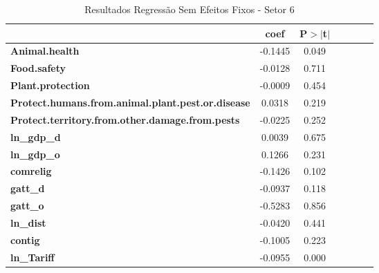\begin{table}[ht]
    
    \begin{center}
        \begin{tabular}{lcccccc}
            & \textbf{coef} & \textbf{P$> |$t$|$}\\
            \midrule
\textbf{Animal.health}                                    &      -0.1445 &         0.049\\
\textbf{Food.safety}                                      &      -0.0128 &         0.711\\
\textbf{Plant.protection}                                 &      -0.0009 &         0.454\\
\textbf{Protect.humans.from.animal.plant.pest.or.disease} &       0.0318 &         0.219\\
\textbf{Protect.territory.from.other.damage.from.pests}   &      -0.0225 &         0.252\\
\textbf{ln\_gdp\_d}                                       &       0.0039 &         0.675\\
\textbf{ln\_gdp\_o}                                       &       0.1266 &         0.231\\
\textbf{comrelig}                                         &      -0.1426 &         0.102\\
\textbf{gatt\_d}                                          &      -0.0937 &         0.118\\
\textbf{gatt\_o}                                          &      -0.5283 &         0.856\\
\textbf{ln\_dist}                                         &      -0.0420 &         0.441\\
\textbf{contig}                                           &      -0.1005 &         0.223\\
\textbf{ln\_Tariff}                                       &      -0.0955 &         0.000\\
\bottomrule
\end{tabular}
\caption{Resultados Regressão Sem Efeitos Fixos - Setor 6}
\end{center}
\end{table}